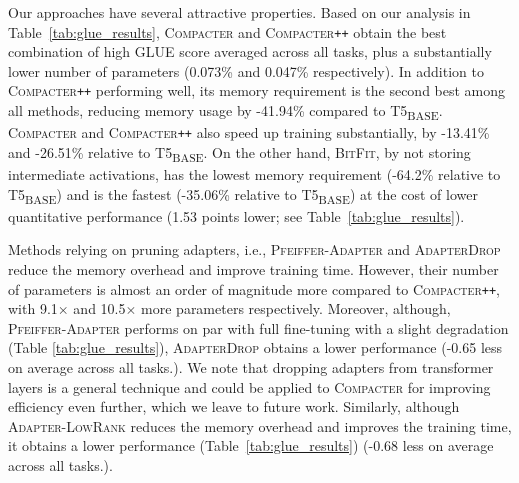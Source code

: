 Our approaches have several attractive properties. Based on our analysis in Table~\ref{tab:glue_results}, \textsc{Compacter} and \textsc{Compacter}\texttt{++} obtain the best combination of high  \textsc{GLUE} score averaged across all tasks, plus a substantially lower number of parameters (0.073\% and 0.047\% respectively). In addition to \textsc{Compacter}\texttt{++} performing well, its memory requirement is the second best among all methods, reducing  memory usage by -41.94\% compared to T5\textsubscript{\tiny BASE}. \textsc{Compacter} and \textsc{Compacter}\texttt{++} also speed up training substantially, by -13.41\% and -26.51\% relative to T5\textsubscript{\tiny BASE}. On the other hand, \textsc{BitFit}, by not storing intermediate activations, has the lowest memory requirement (-64.2\% relative to T5\textsubscript{\tiny BASE}) and is the fastest (-35.06\% relative to T5\textsubscript{\tiny BASE}) at the cost of lower quantitative performance  (1.53 points lower; see Table~\ref{tab:glue_results}).

Methods relying on pruning adapters, i.e., \textsc{Pfeiffer-Adapter} and \textsc{AdapterDrop} reduce the memory overhead and improve training  time. However, their number of parameters is almost an order of magnitude more compared to \textsc{Compacter}\texttt{++}, with 9.1$\times$ and 10.5$\times$ more parameters respectively. Moreover, although, \textsc{Pfeiffer-Adapter} performs on par with full fine-tuning with a slight degradation (Table \ref{tab:glue_results}), \textsc{AdapterDrop} obtains a lower performance (-0.65 less on average across all tasks.). We note that dropping adapters from transformer layers is a general technique and could be applied to \textsc{Compacter} for improving efficiency even further, which we leave to future work. Similarly, although \textsc{Adapter-LowRank} reduces the memory overhead and improves the training time, it obtains a lower performance (Table~\ref{tab:glue_results}) (-0.68 less on average across all tasks.).

